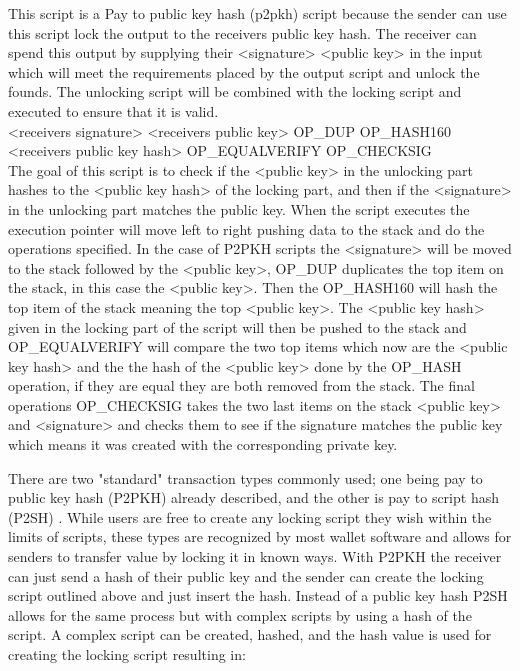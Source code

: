 This script is a Pay to public key hash (p2pkh) script because the sender can use this script lock the output to the receivers public key hash. The receiver can spend this output by supplying their <signature> <public key> in the input which will meet the requirements placed by the output script and unlock the founds. The unlocking script will be combined with the locking script and executed to ensure that it is valid. 
\\

<receivers signature> <receivers public key> OP\_DUP OP\_HASH160 <receivers public key hash> OP\_EQUALVERIFY OP\_CHECKSIG
\\

The goal of this script is to check if the <public key> in the unlocking part hashes to the <public key hash> of the locking part, and then if the <signature> in the unlocking part matches the public key.
When the script executes the execution pointer will move left to right pushing data to the stack and do the operations specified.
In the case of P2PKH scripts the <signature> will be moved to the stack followed by the <public key>, OP\_DUP duplicates the top item on the stack, in this case the <public key>. Then the OP\_HASH160 will hash the top item of the stack meaning the top <public key>. The <public key hash> given in the locking part of the script will then be pushed to the stack and OP\_EQUALVERIFY will compare the two top items which now are the <public key hash> and the the hash of the <public key> done by the OP\_HASH operation, if they are equal they are both removed from the stack. The final operations OP\_CHECKSIG takes the two last items on the stack <public key> and <signature> and checks them to see if the signature matches the public key which means it was created with the corresponding private key.

There are two "standard" transaction types commonly used; one being pay to public key hash (P2PKH) already described, and the other is pay to script hash (P2SH) \cite{BIP16}. While users are free to create any locking script they wish within the limits of scripts, these types are recognized by most wallet software and allows for senders to transfer value by locking it in known ways. With P2PKH the receiver can just send a hash of their public key and the sender can create the locking script outlined above and just insert the hash. Instead of a public key hash P2SH allows for the same process but with complex scripts by using a hash of the script. A complex script can be created, hashed, and the hash value is used for creating the locking script resulting in:
\\

